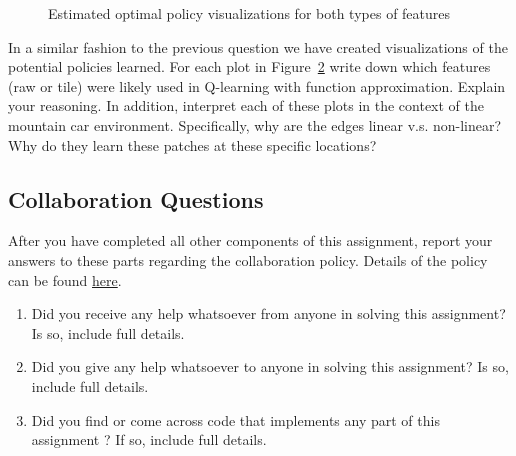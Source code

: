 \documentclass[11pt,addpoints,answers]{exam}
\begin{document}
\begin{questions}
\begin{figure}[H]
\begin{subfigure}{0.5\textwidth}
            \caption{}
            \label{fig:policy_b}
        \end{subfigure}
        \caption{Estimated optimal policy visualizations for both types of features}
        \label{fig:policy}
    \end{figure}

    \question[2] In a similar fashion to the previous question we have created visualizations of the potential policies learned. For each plot in Figure~\ref{fig:policy} write down which features (raw or tile) were likely used in Q-learning with function approximation. Explain your reasoning. In addition, interpret each of these plots in the context of the mountain car environment. Specifically, why are the edges linear v.s. non-linear? Why do they learn these patches at these specific locations? 
        
    \begin{your_solution}[title=Answer,height=5cm,width=15cm]
    \end{your_solution}

    \clearpage
    
\subsection{Collaboration Questions}
    
    After you have completed all other components of this assignment, report your answers to these parts regarding the collaboration policy. Details of the policy can be found \href{https://www.cs.cmu.edu/~10601/#policies}{here}.
    \begin{enumerate}
        \item Did you receive any help whatsoever from anyone in solving this assignment? Is so, include full details.
        \item Did you give any help whatsoever to anyone in solving this assignment? Is so, include full details.
        \item Did you find or come across code that implements any part of this assignment ? If so, include full details.
    \end{enumerate}
    
    \begin{your_solution}[title=Answer,height=10cm,width=15cm]
    \end{your_solution}
\end{questions}
\newpage
\end{document}
